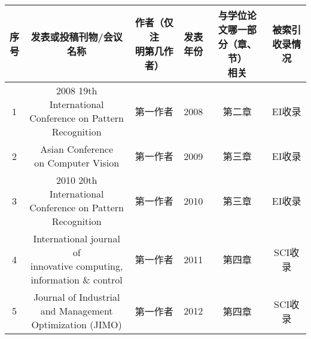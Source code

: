 \begin{publications}{99}

\begin{table}[h]
	\renewcommand\arraystretch{1.5}
	\centering
	\begin{tabular}{|*{6}{c|}}
		\hline
		\tabincell{c}{ 序 \\ 号 } & 发表或投稿刊物/会议名称 & \tabincell{c}{ 作者（仅注\\明第几作\\者） } & \tabincell{c}{发表\\年份} & \tabincell{c}{与学位论\\文哪一部\\分（章、节）\\相关} & \tabincell{c}{被索引\\收录情\\况} \\
		\hline
		1 & \tabincell{c}{ 2008 19th International\\ Conference on Pattern\\ Recognition } & 第一作者 & 2008 & 第二章 & EI收录 \\
		\hline
		2 & \tabincell{c}{ Asian Conference \\ on Computer Vision } & 第一作者 & 2009 & 第三章 & EI收录 \\
		\hline
		3 & \tabincell{c}{ 2010 20th International\\ Conference on Pattern\\ Recognition } & 第一作者 & 2010 & 第三章 & EI收录 \\
		\hline
		4 & \tabincell{c}{ International journal of\\ innovative computing,\\ information \& control } & 第一作者 & 2011 & 第四章 & SCI收录 \\
		\hline
		5 & \tabincell{c}{ Journal of Industrial\\ and Management\\ Optimization (JIMO) } & 第一作者 & 2012 & 第四章 & SCI收录 \\
		\hline
	\end{tabular}
\end{table}

\end{publications}
